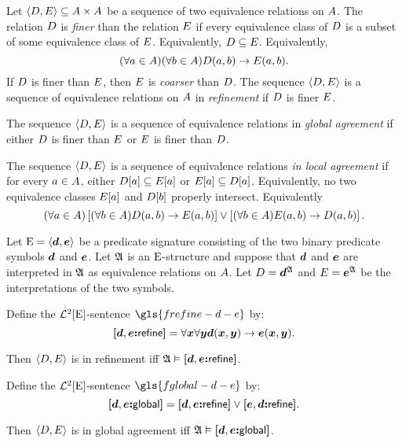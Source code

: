 \begin{definition}
Let $\left\langle D, E \right\rangle \subseteq {A\times A}$ be a sequence of two
equivalence relations on $A$.
The relation $D$ is \emph{finer} than the relation $E$ if every
equivalence class of $D$ is a subset of some equivalence class of $E$.
Equivalently, $D \subseteq E$. Equivalently,
\[
  (\forall a \in A)(\forall b \in A) D(a, b) \rightarrow
  E(a, b).
\]
If $D$ is finer than $E$, then $E$ is \emph{coarser} than $D$.
The sequence $\left\langle D, E \right\rangle$ is a sequence of equivalence relations on
$A$ in \emph{refinement} if $D$ is finer $E$.

The sequence $\left\langle D, E \right\rangle$ is a sequence of equivalence relations in
\emph{global agreement} if either $D$ is finer than $E$ or $E$ is
finer than $D$.

The sequence $\left\langle D, E \right\rangle$ is a sequence of equivalence relations
\emph{in local agreement} if for every $a \in A$, 
either $D[a] \subseteq E[a]$ or $E[a] \subseteq D[a]$.
Equivalently, no two equivalence classes $E[a]$ and $D[b]$ properly
intersect.
Equivalently
\[
  (\forall a \in A)
  \left[(\forall b \in A) D(a, b) \rightarrow E(a, b)\right]
  \lor \left[(\forall b \in A) E(a, b) \rightarrow
  D(a, b)\right].
\]
\end{definition}

Let $\mathrm{E} = \left\langle \bm{d}, \bm{e} \right\rangle$ be a predicate signature consisting of the two binary
predicate symbols $\bm{d}$ and $\bm{e}$.
Let $\mathfrak{A}$ is an $\mathrm{E}$-structure and suppose that $\bm{d}$ and $\bm{e}$ are
interpreted in $\mathfrak{A}$ as equivalence relations on $A$.
Let $D = \bm{d}^{\mathfrak{A}}$ and $E = \bm{e}^{\mathfrak{A}}$ be the interpretations of
the two symbols.

\begin{definition}
Define the $\mathcal{L}^{2}[\mathrm{E}]$-sentence $\gls{frefine-d-e}$ by:
\[
  {\bm{[}\bm{d},\bm{e}\mathord{\bm{:}}\mathsf{refine}\bm{]}} = \forall\bm{x} \forall\bm{y} \bm{d}(\bm{x}, \bm{y}) \rightarrow \bm{e}(\bm{x}, \bm{y}).
\]
\end{definition}
Then $\left\langle D, E \right\rangle$ is in refinement iff 
$\mathfrak{A} \vDash {\bm{[}\bm{d},\bm{e}\mathord{\bm{:}}\mathsf{refine}\bm{]}}$.

\begin{definition}
Define the $\mathcal{L}^{2}[\mathrm{E}]$-sentence $\gls{fglobal-d-e}$ by:
\[
  {\bm{[}\bm{d},\bm{e}\mathord{\bm{:}}\mathsf{global}\bm{]}} = {\bm{[}\bm{d},\bm{e}\mathord{\bm{:}}\mathsf{refine}\bm{]}} \lor {\bm{[}\bm{e},\bm{d}\mathord{\bm{:}}\mathsf{refine}\bm{]}}.
\]
\end{definition}
Then $\left\langle D, E \right\rangle$ is in global agreement iff
$\mathfrak{A} \vDash {\bm{[}\bm{d},\bm{e}\mathord{\bm{:}}\mathsf{global}\bm{]}}$.

